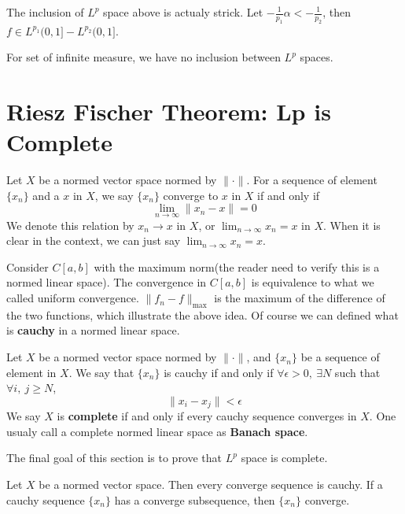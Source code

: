 \documentclass[lang=en, 12pt]{elegantbook}
\begin{document}
        \begin{remark}
            The inclusion of $L^p$ space above is 
        actualy strick. Let $-\frac{1}{p_1}\alpha <-\frac{1}{p_2}$,
        then $f \in L^{p_1}(0,1] - L^{p_2}(0,1]$.\par
            For set of infinite measure, we have no inclusion between 
        $L^p$ spaces.
        \end{remark}
    \section{Riesz Fischer Theorem: Lp is Complete}
        \begin{definition}
            Let $X$ be a normed vector space normed by $\lVert \cdot \rVert$. 
        For a sequence of element $\{x_n\}$ and a $x$ in $X$, 
        we say $\{x_n\}$ converge to $x$ in $X$ if and only if 
        $$ \lim_{n \to \infty} \lVert x_n -x\rVert = 0$$
        We denote this relation by $x_n \to x$ in $X$, or 
        $\lim_{n\to \infty} x_n = x$ in $X$. When it is clear in 
        the context, we can just say $\lim_{n\to \infty} x_n = x$. 
        \end{definition}
        Consider $C[a,b]$ with the maximum norm(the reader need to 
    verify this is a normed linear space). The convergence in $C[a,b]$
    is equivalence to what we called uniform convergence. 
    $\lVert f_n -f \rVert_{\mbox{max}}$ is the maximum of the 
    difference of the two functions, which illustrate the above 
    idea. Of course we can defined what is \textbf{cauchy} in 
    a normed linear space. \par
        \begin{definition}
            Let $X$ be a normed vector space normed by $\lVert \cdot \rVert$,
        and $\{x_n\}$ be a sequence of element in $X$. We say that 
        $\{x_n\}$ is cauchy if and only if $\forall \epsilon> 0, \ 
        \exists N$ such that $\forall i,\ j \geq N$,
        $$\lVert x_i - x_j \rVert < \epsilon$$
        We say $X$ is \textbf{complete} if and only if 
        every cauchy sequence converges in $X$. One usualy
        call a complete normed linear space as \textbf{Banach space}.
        \end{definition}
        The final goal of this section is to prove that $L^p$ space is 
    complete.
        \begin{proposition}\label{SubcauchySequence}
            Let $X$ be a normed vector space. Then every converge
        sequence is cauchy. If a cauchy sequence $\{x_n\}$ has a converge 
        subsequence, then $\{x_n\}$ converge. 
        \end{proposition}
\end{document}
